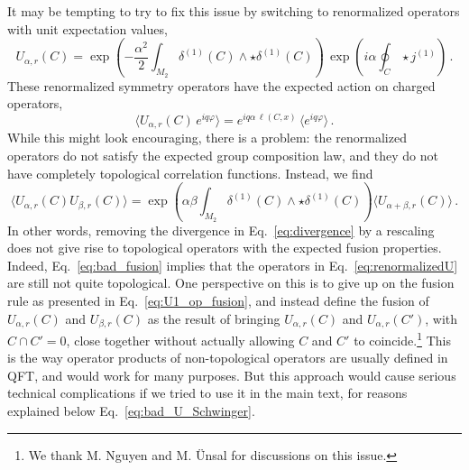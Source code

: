 \documentclass[11pt]{article}
\begin{document}
It may be tempting to try to fix this issue by switching to renormalized operators with unit expectation values,
\begin{equation}
U_{\alpha,r}(C) = \exp{\left(-\frac{\alpha^2}{2}\int_{M_2}\delta^{(1)}(C)\wedge\star\delta^{(1)}(C) \right)}\, \exp{\left(i \alpha \oint_{C} \star j^{(1)}\right)}\,. \label{eq:renormalizedU}
\end{equation}
These renormalized symmetry operators have the expected action on charged operators,
\begin{equation}
\langle U_{\alpha,r}(C) \, e^{iq\varphi}\rangle = e^{i q\alpha\, \ell(C,x)}\,\langle e^{iq\varphi}\rangle\,.    
\end{equation}
While this might look encouraging,  there is a problem: the renormalized operators do not satisfy the expected group composition law, and they do not have completely topological correlation functions. Instead, we find
\begin{equation}
   \langle  U_{\alpha,r}(C) U_{\beta,r}(C) \rangle  = \exp{\left(\alpha\beta\int_{M_2}\delta^{(1)}(C)\wedge\star\delta^{(1)}(C)\right)} \langle  U_{\alpha+\beta,r}(C)\rangle \,.
   \label{eq:bad_fusion}
\end{equation}
In other words, removing the divergence in Eq.~\eqref{eq:divergence} by a rescaling does not give rise to topological operators with the expected fusion properties.  Indeed, Eq.~\eqref{eq:bad_fusion} implies that the operators in Eq.~\eqref{eq:renormalizedU} are still not quite topological.   One perspective on this is to give up on the fusion rule as presented in Eq.~\eqref{eq:U1_op_fusion}, and instead define the fusion of $U_{\alpha, r}(C)$ and $U_{\beta, r}(C)$ as the result of bringing $U_{\alpha,r}(C)$ and $U_{\alpha,r}(C')$, with $C \cap C' = 0$, close together without actually allowing $C$ and $C'$ to coincide.\footnote{We thank M. Nguyen and M. \" Unsal for discussions on this issue.}   This is the way operator products of non-topological operators are usually defined in QFT, and would work for many purposes.  But this approach would cause serious technical complications if we tried to use it in the main text, for reasons explained below Eq.~\eqref{eq:bad_U_Schwinger}. 
\end{document}

